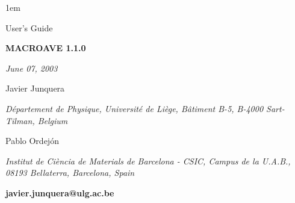 %
%



\textheight 22cm
\textwidth 16cm
\oddsidemargin 1mm
\topmargin -15mm

\baselineskip=14pt
\parskip 5pt
\parindent 1em




\begin{titlepage}

\begin{center}

\vspace{1cm}

{\huge {\sc User's Guide}}

\vspace{4cm}

{\Huge {\bf MACROAVE 1.1.0} }

\vspace{3cm}

{\Large {\it June 07, 2003} }

\vspace{3cm}

{\Large Javier Junquera}

\vspace{5pt}

{\it D\'epartement de Physique, Universit\'e de Li\`ege,
              B\^atiment B-5, B-4000 Sart-Tilman, Belgium}

\vspace{7mm}

{\Large Pablo Ordej\'on}

\vspace{5pt}

{\it Institut de Ci\`encia de Materials de Barcelona - CSIC,
Campus de la U.A.B.,
08193 Bellaterra, Barcelona, Spain}

\vspace{3cm}
{\bf javier.junquera@ulg.ac.be}

\end{center}

\end{titlepage}


